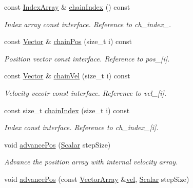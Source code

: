 \begin{DoxyCompactItemize}
const \mbox{\hyperlink{class_space_h_1_1_vel_indep_chain_particles_a48b9183f8d68fe8af42bf405125d450c}{Index\+Array}} \& \mbox{\hyperlink{class_space_h_1_1_vel_indep_chain_particles_a4136b399758a4547ce22024318d9b654}{chain\+Index}} () const
\begin{DoxyCompactList}\small\item\em Index array const interface. Reference to ch\+\_\+index\+\_\+. \end{DoxyCompactList}\item 
const \mbox{\hyperlink{class_space_h_1_1_vel_indep_particles_a61bbcfdb0dc7f99f3c68af69a755c935}{Vector}} \& \mbox{\hyperlink{class_space_h_1_1_vel_indep_chain_particles_a1d1f6b6ed5e916f84e6502d98773ed13}{chain\+Pos}} (size\+\_\+t i) const
\begin{DoxyCompactList}\small\item\em Position vector const interface. Reference to pos\+\_\+\mbox{[}i\mbox{]}. \end{DoxyCompactList}\item 
const \mbox{\hyperlink{class_space_h_1_1_vel_indep_particles_a61bbcfdb0dc7f99f3c68af69a755c935}{Vector}} \& \mbox{\hyperlink{class_space_h_1_1_vel_indep_chain_particles_a05d9529a4ee452b4c15efe92584a6d25}{chain\+Vel}} (size\+\_\+t i) const
\begin{DoxyCompactList}\small\item\em Velocity vecotr const interface. Reference to vel\+\_\+\mbox{[}i\mbox{]}. \end{DoxyCompactList}\item 
const size\+\_\+t \mbox{\hyperlink{class_space_h_1_1_vel_indep_chain_particles_a99486efb9a38d5b097bcb35d46204dfd}{chain\+Index}} (size\+\_\+t i) const
\begin{DoxyCompactList}\small\item\em Index const interface. Reference to ch\+\_\+index\+\_\+\mbox{[}i\mbox{]}. \end{DoxyCompactList}\item 
void \mbox{\hyperlink{class_space_h_1_1_vel_indep_chain_particles_a647d4861878b28d79b6aab00de12ab8d}{advance\+Pos}} (\mbox{\hyperlink{class_space_h_1_1_vel_indep_particles_aeb47d8131b30ed790320ff634f0d6af1}{Scalar}} step\+Size)
\begin{DoxyCompactList}\small\item\em Advance the position array with internal velocity array. \end{DoxyCompactList}\item 
void \mbox{\hyperlink{class_space_h_1_1_vel_indep_chain_particles_ae71e70b6374f8326b5ffb62d06284942}{advance\+Pos}} (const \mbox{\hyperlink{class_space_h_1_1_vel_indep_particles_aa9983058940249df8b00fa800e8cbad2}{Vector\+Array}} \&\mbox{\hyperlink{class_space_h_1_1_vel_indep_chain_particles_aadbc08f6cf8da3e46eb8d6c619e30c2f}{vel}}, \mbox{\hyperlink{class_space_h_1_1_vel_indep_particles_aeb47d8131b30ed790320ff634f0d6af1}{Scalar}} step\+Size)

\end{DoxyCompactItemize}
